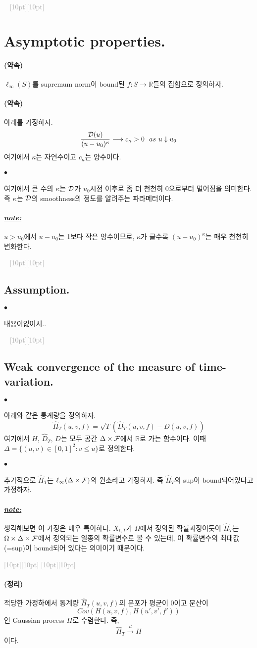 \documentclass[12pt,oneside,english]{book}
\newcommand{\dash}{\vspace{2em}\noindent \textcolor{darkgray}{\hrulefill~ \raisebox{-2.5pt}[10pt][10pt]{\leafright \decofourleft \decothreeleft  \aldineright \decotwo \floweroneleft \decoone   \floweroneright \decotwo \aldineleft\decothreeright \decofourright \leafleft} ~  \hrulefill \\ \vspace{2em}}}
\newcommand{\rdash}{\noindent \textcolor{darkgray}{ \raisebox{-1.9pt}[10pt][10pt]{\leafright} \hrulefill \raisebox{-1.9pt}[10pt][10pt]{\leafright \decofourleft \decothreeleft  \aldineright \decotwo \floweroneleft \decoone}}}
\def\ck{\paragraph{\Large$\bullet$}\Large}
\def\thm{\paragraph{\Large(정리)}\Large}
\def\promise{\paragraph{\Large(약속)}\Large}
\def\note{\paragraph{\Large\textit{\underline{note:}}}\Large}
\begin{document}
\dash 

\section{Asymptotic properties.}
\promise
$\ell_{\infty}(S)$를 supremum norm이 bound된 $f:S\rightarrow \mathbb{R}$들의 집합으로 정의하자. 

\promise 아래를 가정하자. 
$$\frac{{\cal D}(u)}{(u-u_0)^{\kappa}} \longrightarrow c_{\kappa} >0~~as~ u\downarrow u_0$$
여기에서 $\kappa$는 자연수이고 $c_{\kappa}$는 양수이다.

\ck 여기에서 큰 수의 $\kappa$는 $\cal D$가 $u_0$시점 이후로 좀 더 천천히 $0$으로부터 멀어짐을 의미한다. 즉 $\kappa$는 $\cal D$의 smoothness의 정도를 알려주는 파라메터이다. 

\note $u>u_0$에서 $u-u_0$는 1보다 작은 양수이므로, $\kappa$가 클수록 $(u-u_0)^{\kappa}$는 매우 천천히 변화한다.

\dash 

\subsection{Assumption.}

\ck 내용이없어서.. 

\dash 

\subsection{Weak convergence of the measure of time-variation.}

\ck 아래와 같은 통계량을 정의하자. 
$$\hat{H}_T(u,v,f)=\sqrt{T}\left(\hat{D}_T(u,v,f)-D(u,v,f)\right)$$ 
여기에서 $\hat{H}$, $\hat{D}_T$, $D$는 모두 공간 $\Delta \times {\cal F}$에서 $\mathbb{R}$로 가는 함수이다. 이때 $\Delta=\{(u,v)\in [0,1]^2:v\leq u\}$로 정의한다. 

\ck 추가적으로 $\hat{H}_T$는 $\ell_{\infty}(\Delta \times {\cal F})$의 원소라고 가정하자. 즉 $\hat{H}_T$의 sup이 bound되어있다고 가정하자.

\note 생각해보면 이 가정은 매우 특이하다. $X_{t,T}$가 $\Omega$에서 정의된 확률과정이듯이 $\hat{H}_T$는 $\Omega \times \Delta \times {\cal F}$에서 정의되는 일종의 확률변수로 볼 수 있는데, 이 확률변수의 최대값(=sup)이 bound되어 있다는 의미이기 때문이다.

\rdash 

\thm 적당한 가정하에서 통계량 $\hat{H}_T(u,v,f)$의 분포가 평균이 0이고 분산이 $$Cov(H(u,v,f),H(u',v',f'))$$인 Gaussian process $H$로 수렴한다. 즉, 
$$\hat{H}_T \overset{d}{\longrightarrow} H$$
이다. 
\end{document}
